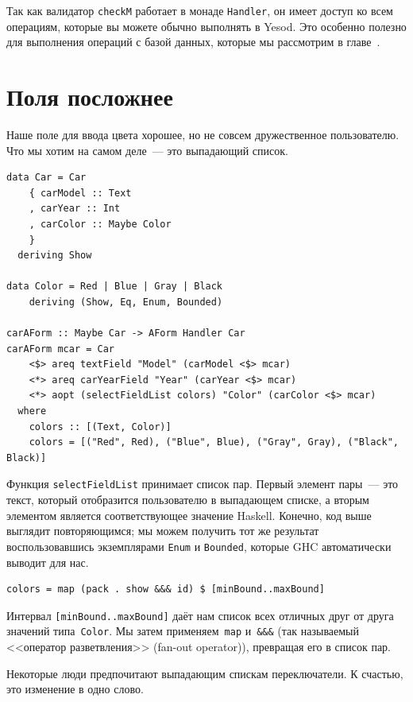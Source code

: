 \begin{remark}
Так как валидатор \lstinline'checkM' работает в монаде \lstinline'Handler', он
имеет доступ ко всем операциям, которые вы можете обычно выполнять в Yesod.
Это особенно полезно для выполнения операций с базой данных, которые мы
рассмотрим в главе~.
\end{remark}

\section{Поля посложнее}
Наше поле для ввода цвета хорошее, но не совсем дружественное пользователю.
Что мы хотим на самом деле~--- это выпадающий список.

\begin{lstlisting}
data Car = Car
    { carModel :: Text
    , carYear :: Int
    , carColor :: Maybe Color
    }
  deriving Show

data Color = Red | Blue | Gray | Black
    deriving (Show, Eq, Enum, Bounded)

carAForm :: Maybe Car -> AForm Handler Car
carAForm mcar = Car
    <$> areq textField "Model" (carModel <$> mcar)
    <*> areq carYearField "Year" (carYear <$> mcar)
    <*> aopt (selectFieldList colors) "Color" (carColor <$> mcar)
  where
    colors :: [(Text, Color)]
    colors = [("Red", Red), ("Blue", Blue), ("Gray", Gray), ("Black", Black)]
\end{lstlisting}%

Функция \lstinline'selectFieldList' принимает список пар. Первый элемент
пары~--- это текст, который отобразится пользователю в выпадающем списке, а
вторым элементом является соответствующее значение Haskell. Конечно, код выше
выглядит повторяющимся; мы можем получить тот же результат воспользовавшись
экземплярами \lstinline'Enum' и \lstinline'Bounded', которые GHC автоматически
выводит для нас.

\begin{lstlisting}
colors = map (pack . show &&& id) $ [minBound..maxBound]
\end{lstlisting}%

Интервал \lstinline'[minBound..maxBound]' даёт нам список всех отличных друг от
друга значений типа~\lstinline'Color'. Мы затем применяем~\lstinline'map'
и~\lstinline'&&&' (так называемый <<оператор разветвления>> (fan-out operator)),
превращая его в список пар.

Некоторые люди предпочитают выпадающим спискам переключатели.  К счастью, это
изменение в одно слово.

